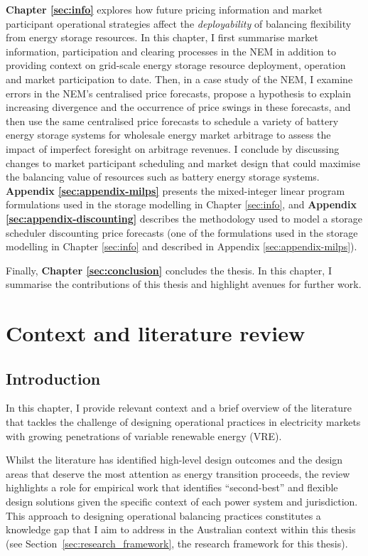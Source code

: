 \documentclass[12pt,a4paper,]{report}
\begin{document}
\textbf{Chapter \ref{sec:info}} explores how future pricing information
and market participant operational strategies affect the
\emph{deployability} of balancing flexibility from energy storage
resources. In this chapter, I first summarise market information,
participation and clearing processes in the NEM in addition to providing
context on grid-scale energy storage resource deployment, operation and
market participation to date. Then, in a case study of the NEM, I
examine errors in the NEM's centralised price forecasts, propose a
hypothesis to explain increasing divergence and the occurrence of price
swings in these forecasts, and then use the same centralised price
forecasts to schedule a variety of battery energy storage systems for
wholesale energy market arbitrage to assess the impact of imperfect
foresight on arbitrage revenues. I conclude by discussing changes to
market participant scheduling and market design that could maximise the
balancing value of resources such as battery energy storage systems.
\textbf{Appendix \ref{sec:appendix-milps}} presents the mixed-integer
linear program formulations used in the storage modelling in Chapter
\ref{sec:info}, and \textbf{Appendix \ref{sec:appendix-discounting}}
describes the methodology used to model a storage scheduler discounting
price forecasts (one of the formulations used in the storage modelling
in Chapter \ref{sec:info} and described in Appendix
\ref{sec:appendix-milps}).

Finally, \textbf{Chapter \ref{sec:conclusion}} concludes the thesis. In
this chapter, I summarise the contributions of this thesis and highlight
avenues for further work.

\hypertarget{sec:lit_review}{%
\chapter{Context and literature review}\label{sec:lit_review}}

\hypertarget{introduction}{%
\section{Introduction}\label{introduction}}

In this chapter, I provide relevant context and a brief overview of the
literature that tackles the challenge of designing operational practices
in electricity markets with growing penetrations of variable renewable
energy (VRE).

Whilst the literature has identified high-level design outcomes and the
design areas that deserve the most attention as energy transition
proceeds, the review highlights a role for empirical work that
identifies ``second-best'' and flexible design solutions given the
specific context of each power system and jurisdiction. This approach to
designing operational balancing practices constitutes a knowledge gap
that I aim to address in the Australian context within this thesis (see
Section~\ref{sec:research_framework}, the research framework for this
thesis).
\end{document}
